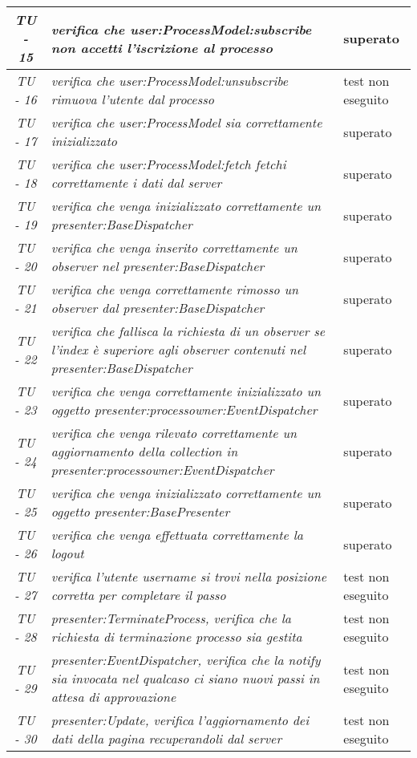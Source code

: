 \begin{small}\centering
\begin{tabular}{|c|p{8.0cm}|p{2.0cm}|}
\hline
\textit{TU - 15} &
\textit{verifica che user:ProcessModel:subscribe non accetti l'iscrizione al processo} &  superato\\
\hline
\textit{TU - 16} &
\textit{verifica che user:ProcessModel:unsubscribe rimuova l'utente dal processo} &  test non eseguito\\
\hline
\textit{TU - 17} &
\textit{verifica che user:ProcessModel sia correttamente inizializzato} & superato \\
\hline
\textit{TU - 18} &
\textit{verifica che user:ProcessModel:fetch fetchi correttamente i dati dal server } & superato \\
\hline
\textit{TU - 19} &
\textit{verifica che venga inizializzato correttamente un presenter:BaseDispatcher} & superato \\
\hline
\textit{TU - 20} &
\textit{ verifica che venga inserito correttamente un observer nel presenter:BaseDispatcher } & superato \\
\hline
\textit{TU - 21} &
\textit{ verifica che venga correttamente rimosso un observer dal presenter:BaseDispatcher} & superato \\
\hline
\textit{TU - 22} &
\textit{ verifica che fallisca la richiesta di un observer se l'index è superiore agli observer contenuti nel presenter:BaseDispatcher} & superato \\
\hline
\textit{TU - 23} &
\textit{verifica che venga correttamente inizializzato un oggetto presenter:processowner:EventDispatcher } & superato \\
\hline
\textit{TU - 24} &
\textit{verifica che venga rilevato correttamente un aggiornamento della collection in presenter:processowner:EventDispatcher} & superato \\
\hline
\textit{TU - 25} &
\textit{verifica che venga inizializzato correttamente un oggetto presenter:BasePresenter } & superato \\
\hline
\textit{TU - 26} &
\textit{verifica che venga effettuata correttamente la logout } & superato \\
\hline
\textit{TU - 27} &
\textit{verifica l'utente username si trovi nella posizione corretta per completare il passo } & test non eseguito \\
\hline
\textit{TU - 28} &
\textit{presenter:TerminateProcess, verifica che la richiesta di terminazione processo sia gestita } & test non eseguito \\
\hline
\textit{TU - 29} &
\textit{presenter:EventDispatcher, verifica che la notify sia invocata nel qualcaso ci siano nuovi passi in attesa di approvazione } & test non eseguito \\
\hline
\textit{TU - 30} &
\textit{presenter:Update, verifica l'aggiornamento dei dati della pagina recuperandoli dal server} & test non eseguito \\
\hline
\end{tabular}\\
\end{small}

